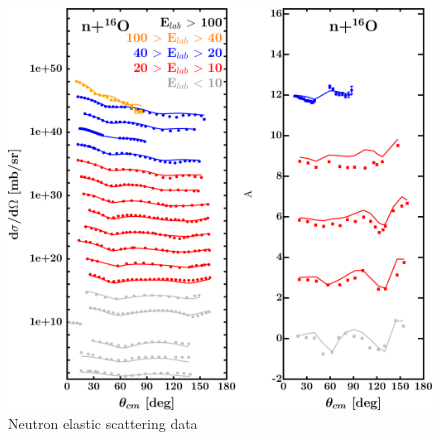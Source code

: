 \begin{figure}[H]
\begin{minipage}{0.45\textwidth}
        \includegraphics[width=1.0\textwidth]{figures/o16_neutronElastic.png}
        \caption{Neutron elastic scattering data}
        \label{DOMFitData_o16_neutron_elastic}
    \end{minipage}
\end{figure}

